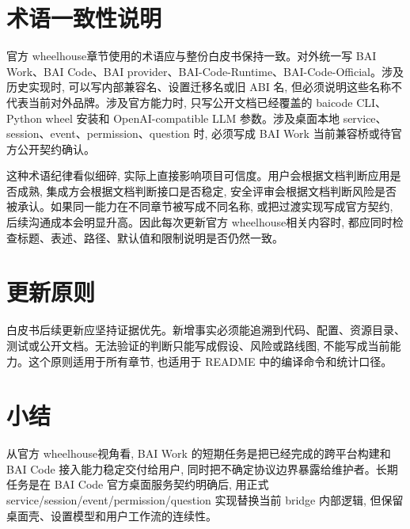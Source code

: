 \section{术语一致性说明}
官方 wheelhouse章节使用的术语应与整份白皮书保持一致。对外统一写 BAI Work、BAI Code、BAI provider、BAI-Code-Runtime、BAI-Code-Official。涉及历史实现时, 可以写内部兼容名、设置迁移名或旧 ABI 名, 但必须说明这些名称不代表当前对外品牌。涉及官方能力时, 只写公开文档已经覆盖的 baicode CLI、Python wheel 安装和 OpenAI-compatible LLM 参数。涉及桌面本地 service、session、event、permission、question 时, 必须写成 BAI Work 当前兼容桥或待官方公开契约确认。

这种术语纪律看似细碎, 实际上直接影响项目可信度。用户会根据文档判断应用是否成熟, 集成方会根据文档判断接口是否稳定, 安全评审会根据文档判断风险是否被承认。如果同一能力在不同章节被写成不同名称, 或把过渡实现写成官方契约, 后续沟通成本会明显升高。因此每次更新官方 wheelhouse相关内容时, 都应同时检查标题、表述、路径、默认值和限制说明是否仍然一致。

\section{更新原则}
白皮书后续更新应坚持证据优先。新增事实必须能追溯到代码、配置、资源目录、测试或公开文档。无法验证的判断只能写成假设、风险或路线图, 不能写成当前能力。这个原则适用于所有章节, 也适用于 README 中的编译命令和统计口径。

\section{小结}
从官方 wheelhouse视角看, BAI Work 的短期任务是把已经完成的跨平台构建和 BAI Code 接入能力稳定交付给用户, 同时把不确定协议边界暴露给维护者。长期任务是在 BAI Code 官方桌面服务契约明确后, 用正式 service/session/event/permission/question 实现替换当前 bridge 内部逻辑, 但保留桌面壳、设置模型和用户工作流的连续性。
